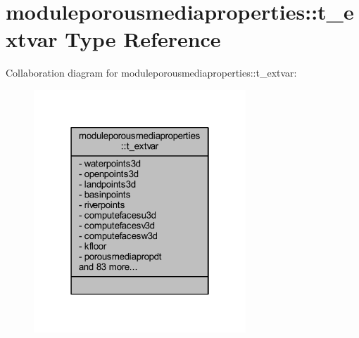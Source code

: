 \hypertarget{structmoduleporousmediaproperties_1_1t__extvar}{}\section{moduleporousmediaproperties\+:\+:t\+\_\+extvar Type Reference}
\label{structmoduleporousmediaproperties_1_1t__extvar}


Collaboration diagram for moduleporousmediaproperties\+:\+:t\+\_\+extvar\+:\nopagebreak
\begin{figure}[H]
\begin{center}
\leavevmode
\includegraphics[width=226pt]{structmoduleporousmediaproperties_1_1t__extvar__coll__graph}
\end{center}
\end{figure}
